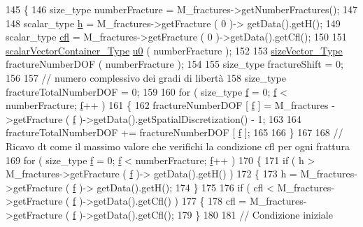 \begin{DoxyCode}
145 \{
146     size\_type numberFracture = M\_fractures->getNumberFractures();
147 
148     scalar\_type \hyperlink{confronto_8m_a5e36941b3d856737e81516acd45edc50}{h} = M\_fractures->getFracture ( 0 )-> getData().getH();
149     scalar\_type \hyperlink{discontinuo_8m_ad9cea4edeb9e9d51c1305958394049ef}{cfl} = M\_fractures->getFracture ( 0 )->getData().getCfl();
150 
151     \hyperlink{Core_8h_ae3afecb4de4310d8262e9ab20cfb875b}{scalarVectorContainer\_Type} \hyperlink{god__e_8m_ae060ce5868d35ef17bcb6e832da03be9}{u0} ( numberFracture );
152 
153     \hyperlink{Core_8h_a83c51913d041a5001e8683434c09857f}{sizeVector\_Type} fractureNumberDOF ( numberFracture );
154 
155     size\_type fractureShift = 0;
156 
157     \textcolor{comment}{// numero complessivo dei gradi di libertà}
158     size\_type fractureTotalNumberDOF = 0;
159 
160     \textcolor{keywordflow}{for} ( size\_type \hyperlink{god__e_8m_a68f477f9b30a6300d5af9b02eac82f35}{f} = 0; \hyperlink{god__e_8m_a68f477f9b30a6300d5af9b02eac82f35}{f} < numberFracture; \hyperlink{god__e_8m_a68f477f9b30a6300d5af9b02eac82f35}{f}++ )
161     \{
162         fractureNumberDOF [ \hyperlink{god__e_8m_a68f477f9b30a6300d5af9b02eac82f35}{f} ] = M\_fractures ->getFracture ( \hyperlink{god__e_8m_a68f477f9b30a6300d5af9b02eac82f35}{f} )->getData().getSpatialDiscretization() -
       1;
163 
164         fractureTotalNumberDOF += fractureNumberDOF [ \hyperlink{god__e_8m_a68f477f9b30a6300d5af9b02eac82f35}{f} ];
165 
166     \}
167 
168     \textcolor{comment}{// Ricavo dt come il massimo valore che verifichi la condizione cfl per ogni frattura}
169     \textcolor{keywordflow}{for} ( size\_type \hyperlink{god__e_8m_a68f477f9b30a6300d5af9b02eac82f35}{f} = 0; \hyperlink{god__e_8m_a68f477f9b30a6300d5af9b02eac82f35}{f} < numberFracture; \hyperlink{god__e_8m_a68f477f9b30a6300d5af9b02eac82f35}{f}++ )
170     \{
171         \textcolor{keywordflow}{if} ( h > M\_fractures->getFracture ( \hyperlink{god__e_8m_a68f477f9b30a6300d5af9b02eac82f35}{f} )-> getData().getH() )
172         \{
173             h = M\_fractures->getFracture ( \hyperlink{god__e_8m_a68f477f9b30a6300d5af9b02eac82f35}{f} )-> getData().getH();
174         \}
175 
176         \textcolor{keywordflow}{if} ( cfl < M\_fractures->getFracture ( \hyperlink{god__e_8m_a68f477f9b30a6300d5af9b02eac82f35}{f} )->getData().getCfl() )
177         \{
178             cfl = M\_fractures->getFracture ( \hyperlink{god__e_8m_a68f477f9b30a6300d5af9b02eac82f35}{f} )->getData().getCfl();
179         \}
180 
181         \textcolor{comment}{// Condizione iniziale}

\end{DoxyCode}
